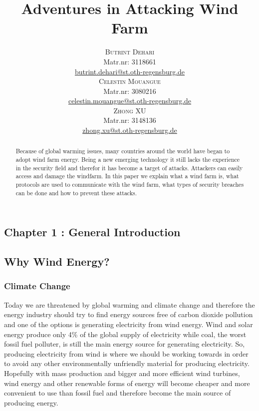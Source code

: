 \documentclass[twosided,a4,10pt]{article}
\title{\vspace{-5mm}%
	\fontsize{20pt}{10pt}\selectfont
	\textbf{Adventures in Attacking Wind Farm}
	}
\author{
	\large
       \begin{minipage}[t]{0.33\linewidth}
         \begin{center}
           	\textsc{Butrint Dehari}\\[2mm]
                 \normalsize	Matr.nr: 3118661\\
                 \normalsize
                 \href{mailto:autor1@stud.oth-regensburg.de}
                 {butrint.dehari@st.oth-regensburg.de}      
         \end{center}
       \end{minipage}        
       \begin{minipage}[t]{0.33\linewidth}
         \begin{center}
           	\textsc{Celestin Mouangue}\\[2mm]
                 \normalsize	Matr.nr: 3080216\\
                 \normalsize
                 \href{mailto:autor2@stud.oth-regensburg.de}
                 {celestin.mouangue@st.oth-regensburg.de}      
         \end{center}
       \end{minipage}
       \begin{minipage}[t]{0.33\linewidth}
         \begin{center}
           	\textsc{Zhong XU}\\[2mm]
                 \normalsize	Matr.nr: 3148136\\
                 \normalsize
                 \href{mailto:autor3@stud.oth-regensburg.de}
                 {zhong.xu@st.oth-regensburg.de}      
         \end{center}
       \end{minipage}
     }
\begin{document}
\maketitle
\thispagestyle{fancy}

\begin{abstract}
\noindent 
Because of global warming issues, many countries around the world have began to adopt wind farm energy. Being a new emerging technology it still lacks the experience in the security field and therefor it has become a target of attacks. Attackers can easily access and damage the windfarm. In this paper we explain what a wind farm is, what protocols are used to communicate with the wind farm, what types of security breaches can be done and how to prevent these attacks.
\end{abstract}
\begin{multicols}{2}


\section{Chapter 1 : General Introduction}
 \subsection{Why Wind Energy?}
 \subsubsection{Climate Change}
 Today we are threatened by global warming and climate change and therefore the energy industry should try to find energy sources free of carbon dioxide pollution and one of the options is generating electricity from wind energy. Wind and solar energy produce only 4\% of the global supply of electricity while coal, the worst fossil fuel polluter, is still the main energy source for generating electricity. So, producing electricity from wind is where we should be working towards in order to avoid any other environmentally unfriendly material for producing electricity. Hopefully with mass production and bigger and more efficient wind turbines, wind energy and other renewable forms of energy will become cheaper and more convenient to use than fossil fuel and therefore become the main source of producing energy.

\end{multicols}
\end{document}
